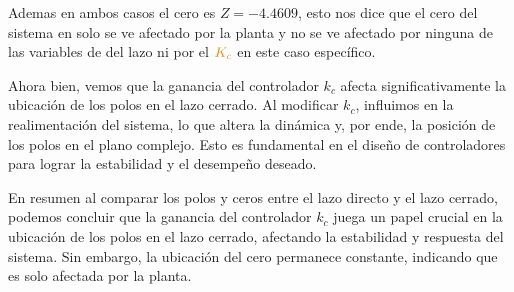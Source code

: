 Ademas en ambos casos el cero es \(Z= -4.4609\), esto nos dice que el cero del sistema en solo se ve afectado por la planta y no se ve afectado por ninguna de las variables de del lazo ni por el \(\nara{K_c}\) en este caso específico.

Ahora bien, vemos que la ganancia del controlador \( k_c \) afecta significativamente la ubicación de los polos en el lazo cerrado. Al modificar \( k_c \), influimos en la realimentación del sistema, lo que altera la dinámica y, por ende, la posición de los polos en el plano complejo. Esto es fundamental en el diseño de controladores para lograr la estabilidad y el desempeño deseado.

En resumen al comparar los polos y ceros entre el lazo directo y el lazo cerrado, podemos concluir que la ganancia del controlador \( k_c \) juega un papel crucial en la ubicación de los polos en el lazo cerrado, afectando la estabilidad y respuesta del sistema. Sin embargo, la ubicación del cero permanece constante, indicando que es solo afectada por la planta.